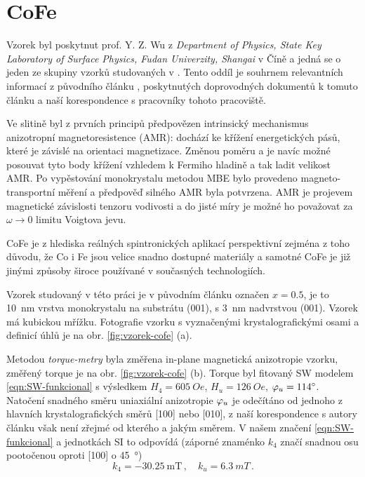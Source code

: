 \section{CoFe}
\label{chap:vzorek-cofe}

Vzorek byl poskytnut prof. Y. Z. Wu z \emph{Department of Physics, State Key Laboratory of Surface Physics, Fudan Univerzity, Shangai} v Číně a jedná se o jeden ze skupiny vzorků studovaných v \cite{zengIntrinsicMechanismAnisotropic2020}.
Tento oddíl je souhrnem relevantních informací z původního článku \cite{zengIntrinsicMechanismAnisotropic2020}, poskytnutých doprovodných dokumentů k tomuto článku a naší korespondence s pracovníky tohoto pracoviště.

Ve slitině  byl z prvních principů předpovězen intrinsický mechanismus anizotropní magnetoresistence (AMR): dochází ke křížení energetických pásů, které je závislé na orientaci magnetizace.
Změnou poměru  a  je navíc možné posouvat tyto body křížení vzhledem k Fermiho hladině a tak ladit velikost AMR.
Po vypěstování monokrystalu metodou MBE bylo provedeno magneto-transportní měření a předpověď silného AMR byla potvrzena\cite{zengIntrinsicMechanismAnisotropic2020}.
AMR je projevem magnetické závislosti tenzoru vodivosti a do jisté míry je možné ho považovat za $\omega\to 0$ limitu Voigtova jevu\cite{tesarovaSystematicStudyMagnetic2014}.

CoFe je z hlediska reálných spintronických aplikací perspektivní zejména z toho důvodu, že Co i Fe jsou velice snadno dostupné materiály a samotné CoFe je již jinými způsoby široce používané v současných technologiích.

Vzorek studovaný v této práci je v původním článku označen $x=0.5$, je to \SI{10}{\nano\meter} vrstva monokrystalu  na substrátu (001), s \SI{3}{\nano\meter} nadvrstvou (001).
Vzorek má kubickou mřížku.
Fotografie vzorku s vyznačenými krystalografickými osami a definicí úhlů je na obr. \ref{fig:vzorek-cofe} (a).

Metodou \emph{torque-metry} byla změřena in-plane magnetická anizotropie vzorku, změřený torque je na obr. \ref{fig:vzorek-cofe} (b).
Torque byl fitovaný SW modelem \eqref{eqn:SW-funkcional} s výsledkem $H_4=\SI{605}{Oe}$, $H_u=\SI{126}{Oe}$, $\varphi_u=\SI{114}{\degree}$.
Natočení snadného směru uniaxiální anizotropie $\varphi_u$ je odečítáno od jednoho z hlavních krystalografických směrů [100] nebo [010], z naší korespondence s autory článku \cite{zengIntrinsicMechanismAnisotropic2020} však není zřejmé od kterého a jakým směrem.
V našem značení \eqref{eqn:SW-funkcional} a jednotkách SI to odpovídá (záporné znaménko $k_4$ značí snadnou osu pootočenou oproti [100] o \SI{45}{\degree})
\begin{equation}
\label{eqn:cofe-anizotropni-konstanty-cina}
    k_4 = -\SI{30.25}{\milli\tesla} \,,\quad k_u = \SI{6.3}{mT} \,.
\end{equation}


